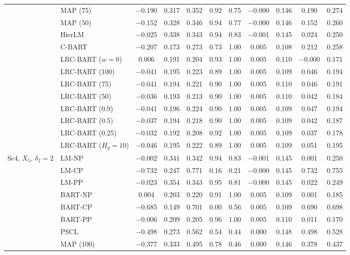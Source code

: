 \begin{center}
\begin{longtable}{llccccccccc}
& MAP (75) & $-$0.190 & 0.317 & 0.352 & 0.92 & 0.75 & $-$0.000 & 0.146 & 0.190 & 0.274 \\
& MAP (50) & $-$0.152 & 0.328 & 0.346 & 0.94 & 0.77 & $-$0.000 & 0.146 & 0.152 & 0.260 \\
& HierLM & $-$0.025 & 0.338 & 0.343 & 0.94 & 0.83 & $-$0.001 & 0.145 & 0.024 & 0.250 \\
& C-BART & $-$0.207 & 0.173 & 0.273 & 0.73 & 1.00 & 0.005 & 0.108 & 0.212 & 0.258 \\
& LRC-BART ($w=0$) & 0.006 & 0.191 & 0.204 & 0.93 & 1.00 & 0.005 & 0.110 & $-$0.000 & 0.171 \\
& LRC-BART (100) & $-$0.041 & 0.195 & 0.223 & 0.89 & 1.00 & 0.005 & 0.109 & 0.046 & 0.194 \\
& LRC-BART (75) & $-$0.041 & 0.194 & 0.221 & 0.90 & 1.00 & 0.005 & 0.110 & 0.046 & 0.191 \\
& LRC-BART (50) & $-$0.036 & 0.193 & 0.213 & 0.90 & 1.00 & 0.005 & 0.110 & 0.042 & 0.184 \\
& LRC-BART (0.9) & $-$0.041 & 0.196 & 0.224 & 0.90 & 1.00 & 0.005 & 0.109 & 0.047 & 0.194 \\
& LRC-BART (0.5) & $-$0.037 & 0.194 & 0.218 & 0.90 & 1.00 & 0.005 & 0.109 & 0.042 & 0.187 \\
& LRC-BART (0.25) & $-$0.032 & 0.192 & 0.208 & 0.92 & 1.00 & 0.005 & 0.109 & 0.037 & 0.178 \\
& LRC-BART ($H_g=10$) & $-$0.046 & 0.195 & 0.222 & 0.89 & 1.00 & 0.005 & 0.109 & 0.051 & 0.195 \\
\midrule
\multirow{20}{*}{Sc4, $X_5$, $\delta_2=2$} & LM-NP & $-$0.002 & 0.341 & 0.342 & 0.94 & 0.83 & $-$0.001 & 0.145 & 0.001 & 0.250 \\
& LM-CP & $-$0.732 & 0.247 & 0.771 & 0.16 & 0.21 & $-$0.000 & 0.145 & 0.732 & 0.755 \\
& LM-PP & $-$0.023 & 0.354 & 0.343 & 0.95 & 0.81 & $-$0.000 & 0.145 & 0.022 & 0.249 \\
& BART-NP & 0.004 & 0.203 & 0.220 & 0.91 & 1.00 & 0.005 & 0.109 & 0.001 & 0.185 \\
& BART-CP & $-$0.685 & 0.149 & 0.701 & 0.00 & 0.56 & 0.005 & 0.109 & 0.690 & 0.698 \\
& BART-PP & $-$0.006 & 0.209 & 0.205 & 0.96 & 1.00 & 0.005 & 0.110 & 0.011 & 0.170 \\
& PSCL & $-$0.498 & 0.273 & 0.562 & 0.54 & 0.44 & 0.000 & 0.148 & 0.498 & 0.528 \\
& MAP (100) & $-$0.377 & 0.333 & 0.495 & 0.78 & 0.46 & 0.000 & 0.146 & 0.378 & 0.437 \\

\end{longtable}
\end{center}
